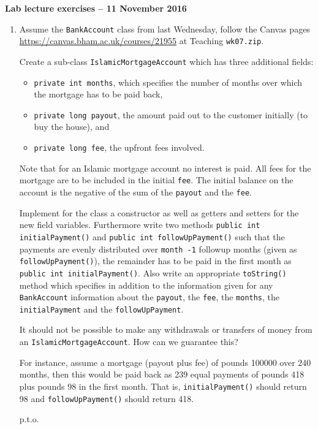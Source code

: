 \documentclass[12pt]{article}
\newcommand{\myhead}[1]{\begin{center}\large\bf #1\end{center}}
\begin{document}
\myhead{Lab lecture exercises -- 11 November 2016}

\begin{enumerate}
\item Assume the \texttt{BankAccount} class from last Wednesday,
  follow the Canvas pages
  \url{https://canvas.bham.ac.uk/courses/21955} at Teaching
  \texttt{wk07.zip}.

 Create
  a sub-class \texttt{IslamicMortgageAccount} which has three additional
  fields:
\begin{itemize} 
\item \texttt{private int months}, which specifies the number of
  months over which the mortgage has to be paid back, 
\item \texttt{private long payout}, the amount paid out to the customer initially (to buy the house), and
\item \texttt{private long fee}, the upfront fees involved.
\end{itemize}
Note that for an Islamic mortgage account no interest is paid. All
fees for the mortgage are to be included in the initial
\texttt{fee}. The initial balance on the account is the negative of
the sum of the \texttt{payout} and the \texttt{fee}.

Implement for the class a constructor as well as getters and setters for the new
field variables. Furthermore write two methods \texttt{public int
  initialPayment()} and \texttt{public int followUpPayment()} such that
the payments are evenly distributed over
\texttt{month -1} followup months (given as
\texttt{followUpPayment()}), the remainder has to be paid in the first month
as \texttt{public int initialPayment()}. Also write an appropriate
\texttt{toString()} method which specifies in addition to the
  information given for any \texttt{BankAccount} information about the
  \texttt{payout}, the \texttt{fee}, the \texttt{months}, the
  \texttt{initialPayment} and the \texttt{followUpPayment}.

  It should not be possible to make any withdrawals or transfers of money from an
  \texttt{IslamicMortgageAccount}. How can we guarantee this?

For instance, assume a mortgage (payout plus fee) of pounds 100000
over 240 months, then this would be paid back as 239 equal payments of
pounds 418 plus pounds 98 in the first month. That is,
\texttt{initialPayment()} should return 98 and
\texttt{followUpPayment()} should return 418.

\vfill
\hfill p.t.o.
\newpage


\end{enumerate}
\end{document}
